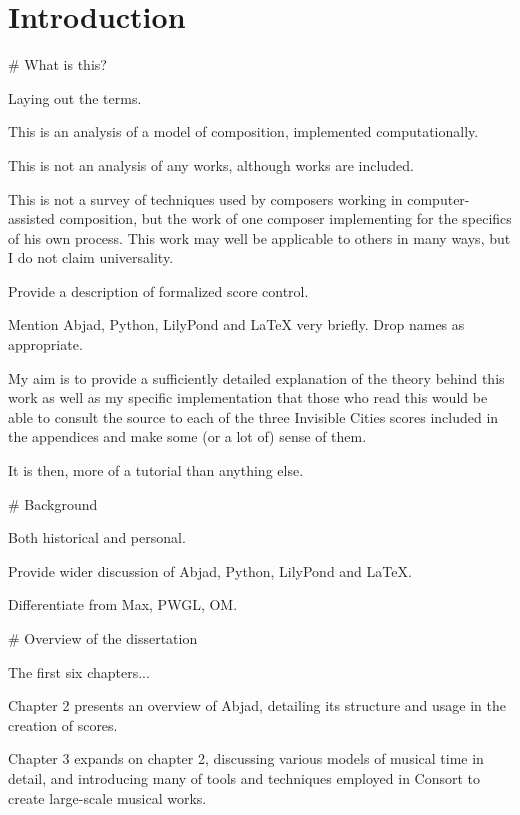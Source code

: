 \chapter{Introduction}
\label{chap:introduction}

\begin{markdown}

# What is this?

Laying out the terms.

This is an analysis of a model of composition, implemented computationally.

This is not an analysis of any works, although works are included.

This is not a survey of techniques used by composers working in
computer-assisted composition, but the work of one composer implementing for
the specifics of his own process. This work may well be applicable to others in
many ways, but I do not claim universality.

Provide a description of formalized score control.

Mention Abjad, Python, LilyPond and LaTeX very briefly. Drop names as
appropriate.

My aim is to provide a sufficiently detailed explanation of the theory behind
this work as well as my specific implementation that those who read
this would be able to consult the source to each of the three Invisible Cities
scores included in the appendices and make some (or a lot of) sense of them.

It is then, more of a tutorial than anything else.

# Background

Both historical and personal.

Provide wider discussion of Abjad, Python, LilyPond and LaTeX.

Differentiate from Max, PWGL, OM.

# Overview of the dissertation

The first six chapters...

Chapter 2 presents an overview of Abjad, detailing its structure and usage in
the creation of scores.

Chapter 3 expands on chapter 2, discussing various models of musical time in
detail, and introducing many of tools and techniques employed in Consort to
create large-scale musical works.


\end{markdown}
